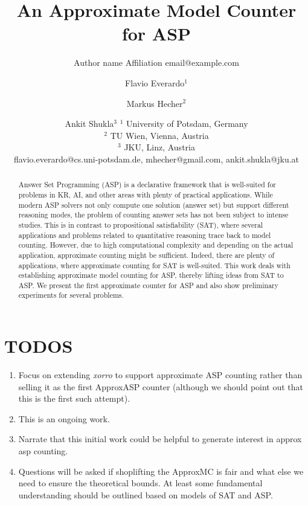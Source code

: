 \documentclass{article}
\title{An Approximate Model Counter for ASP}
\author{%
    Author name
    \affiliations
    Affiliation
    \emails
    email@example.com    %
}
\author{%
Flavio Everardo$^1$\and
Markus Hecher$^2$\and
Ankit Shukla$^{3}$
\affiliations
$^1$ University of Potsdam, Germany\\
$^2$ TU Wien, Vienna, Austria\\
$^3$ JKU, Linz, Austria\\
\emails
flavio.everardo@cs.uni-potsdam.de,
mhecher@gmail.com,
ankit.shukla@jku.at
}
\begin{document}
\maketitle

\begin{abstract}
Answer Set Programming (ASP) is a declarative framework that is well-suited for problems in KR, AI, and other areas with plenty of practical applications.
While modern ASP solvers not only compute one solution (answer set) but support different reasoning modes,  the problem of counting answer sets has not been subject to intense studies.
This is in contrast to propositional satisfiability (SAT), where several applications and problems related to quantitative reasoning trace back to model counting. However, due to high computational complexity and depending on the actual application, approximate counting might be sufficient. Indeed, there are plenty of applications, where approximate counting for SAT is well-suited. This work deals with establishing approximate model counting for ASP, thereby lifting ideas from SAT to ASP. We present the first approximate counter for ASP and also show preliminary experiments for several problems.
\end{abstract}

\setcounter{section}{-1}
\section{TODOS} \label{sec:todos}
\begin{enumerate}
	\item Focus on extending \emph{xorro} to support approximate ASP counting rather than selling it as the first ApproxASP counter (although we should point out that this is the first such attempt).
	\item This is an ongoing work. 
	\item Narrate that this initial work could be helpful to generate interest in approx asp counting.
	\item Questions will be asked if shoplifting the ApproxMC is fair and what else we need to ensure the theoretical bounds. At least some fundamental understanding should be outlined based on models of SAT and ASP.  
\end{enumerate}
\end{document}

